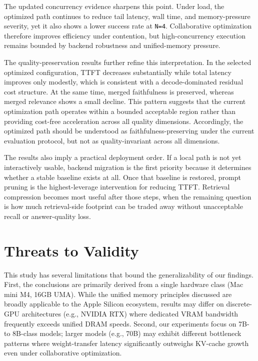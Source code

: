 \documentclass[10pt,twocolumn]{article}
\begin{document}
The updated concurrency evidence sharpens this point. Under load, the optimized path continues to reduce tail latency, wall time, and memory-pressure severity, yet it also shows a lower success rate at \texttt{N=4}. Collaborative optimization therefore improves efficiency under contention, but high-concurrency execution remains bounded by backend robustness and unified-memory pressure.

The quality-preservation results further refine this interpretation. In the selected optimized configuration, TTFT decreases substantially while total latency improves only modestly, which is consistent with a decode-dominated residual cost structure. At the same time, merged faithfulness is preserved, whereas merged relevance shows a small decline. This pattern suggests that the current optimization path operates within a bounded acceptable region rather than providing cost-free acceleration across all quality dimensions. Accordingly, the optimized path should be understood as faithfulness-preserving under the current evaluation protocol, but not as quality-invariant across all dimensions.

The results also imply a practical deployment order. If a local path is not yet interactively usable, backend migration is the first priority because it determines whether a stable baseline exists at all. Once that baseline is restored, prompt pruning is the highest-leverage intervention for reducing TTFT. Retrieval compression becomes most useful after those steps, when the remaining question is how much retrieval-side footprint can be traded away without unacceptable recall or answer-quality loss.

\section{Threats to Validity}

This study has several limitations that bound the generalizability of our findings. First, the conclusions are primarily derived from a single hardware class (Mac mini M4, 16GB UMA). While the unified memory principles discussed are broadly applicable to the Apple Silicon ecosystem, results may differ on discrete-GPU architectures (e.g., NVIDIA RTX) where dedicated VRAM bandwidth frequently exceeds unified DRAM speeds. Second, our experiments focus on 7B- to 8B-class models; larger models (e.g., 70B) may exhibit different bottleneck patterns where weight-transfer latency significantly outweighs KV-cache growth even under collaborative optimization.
\end{document}
